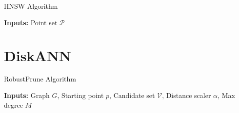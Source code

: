 \begin{algorithm}[H]
    \caption{HNSW Algorithm}\label{alg:hnsw}
    \begin{algorithmic}[1]
            \EndFor
        \EndFunction
    \end{algorithmic}
\end{algorithm}

\textbf{Inputs:} Point set \(\mathcal{P}\)


\section{DiskANN}


\begin{algorithm}[H]
    \caption{RobustPrune Algorithm}\label{alg:robust-prune}
    \begin{algorithmic}[1]
                \EndIf
                    \EndIf
                \EndFor
            \EndWhile
        \EndProcedure
    \end{algorithmic}
\end{algorithm}

\textbf{Inputs:} Graph \(G\), Starting point \(p\), Candidate set \(\mathcal{V}\), Distance scaler \(\alpha\), Max degree \(M\)



